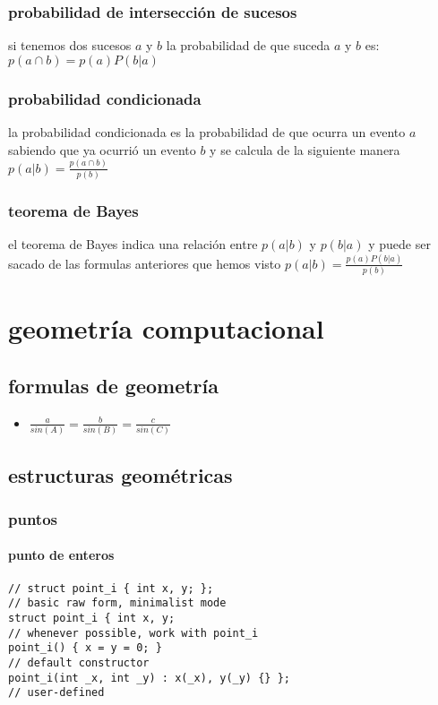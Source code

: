 \documentclass[11pt,a4paper]{book}
\begin{document}
\subsection{probabilidad de intersección de sucesos}
si tenemos dos sucesos $a$ y $b$ la probabilidad de que suceda $a$ y $b$ es:
$p(a\cap b)=p(a)P(b|a)$\\
\subsection{probabilidad condicionada}
la probabilidad condicionada es la probabilidad de que ocurra un evento $a$ sabiendo que ya ocurrió un evento $b$ y se calcula de la siguiente manera $p(a|b)=\frac{p(a\cap b)}{p(b)}$
\subsection{teorema de Bayes}
el teorema de Bayes indica una relación entre $p(a|b)$ y $p(b|a)$ y puede ser sacado de las formulas anteriores que hemos visto $p(a|b)=\frac{p(a)P(b|a)}{p(b)}$
\chapter{geometría computacional}
\section{formulas de geometría}
\begin{itemize}
\item $\frac{a}{sin(A)}=\frac{b}{sin(B)}=\frac{c}{sin(C)}$ 
\end{itemize}
\section{estructuras geométricas}
\subsection{puntos}
\subsubsection{punto de enteros}
\begin{lstlisting}[style=C]
// struct point_i { int x, y; };
// basic raw form, minimalist mode
struct point_i { int x, y;
// whenever possible, work with point_i
point_i() { x = y = 0; }
// default constructor
point_i(int _x, int _y) : x(_x), y(_y) {} };
// user-defined
\end{lstlisting}
\end{document}
